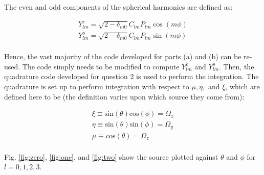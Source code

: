 \documentclass[10pt]{article}
\begin{document}
The even and odd components of the spherical harmonics are defined as:

\begin{equation}
\label{eq:RealExpansionSH}
\begin{aligned}
Y_{lm}^e=\sqrt{2-\delta_{m0}}C_{lm}P_{lm}\cos{(m\phi)}\\
Y_{lm}^o=\sqrt{2-\delta_{m0}}C_{lm}P_{lm}\sin{(m\phi)}\\
\end{aligned}
\end{equation}

Hence, the vast majority of the code developed for parts (a) and (b) can be re-used. The code simply needs to be modified to compute \(Y_{lm}^e\) and \(Y_{lm}^o\). Then, the quadrature code developed for question 2 is used to perform the integration. The quadrature is set up to perform integration with respect to \(\mu,\eta,\) and \(\xi\), which are defined here to be (the definition varies upon which source they come from):

\begin{equation}
\label{eq:OmegaComponentsCartesian}
\begin{aligned}
 \xi \equiv \textrm{sin}(\theta)\textrm{cos}(\phi)=\Omega_x\\
 \eta \equiv \textrm{sin}(\theta)\textrm{sin}(\phi)=\Omega_y\\
 \mu \equiv \textrm{cos}(\theta)=\Omega_z\\
\end{aligned}
\end{equation}

Fig. \ref{fig:zero}, \ref{fig:one}, and \ref{fig:two} show the source plotted against \(\theta\) and \(\phi\) for \(l=0,1,2, 3\).
\end{document}
